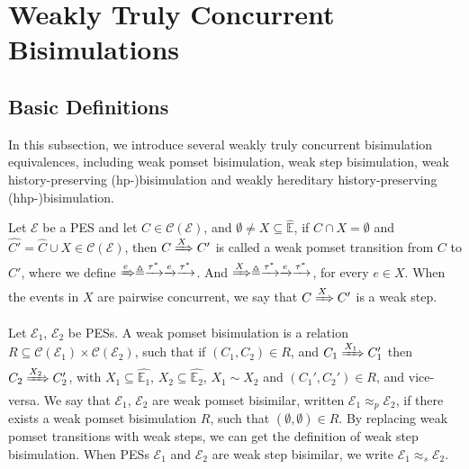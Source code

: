 \section{Weakly Truly Concurrent Bisimulations}\label{wtcb}

\subsection{Basic Definitions}\label{WTCC}

In this subsection, we introduce several weakly truly concurrent bisimulation equivalences, including weak pomset bisimulation, weak step bisimulation, weak history-preserving (hp-)bisimulation and weakly hereditary history-preserving (hhp-)bisimulation.

\begin{definition}\label{WPT}
Let $\mathcal{E}$ be a PES and let $C\in\mathcal{C}(\mathcal{E})$, and $\emptyset\neq X\subseteq \hat{\mathbb{E}}$, if $C\cap X=\emptyset$ and $\hat{C'}=\hat{C}\cup X\in\mathcal{C}(\mathcal{E})$, then $C\xRightarrow{X} C'$ is called a weak pomset transition from $C$ to $C'$, where we define $\xRightarrow{e}\triangleq\xrightarrow{\tau^*}\xrightarrow{e}\xrightarrow{\tau^*}$. And $\xRightarrow{X}\triangleq\xrightarrow{\tau^*}\xrightarrow{e}\xrightarrow{\tau^*}$, for every $e\in X$. When the events in $X$ are pairwise concurrent, we say that $C\xRightarrow{X}C'$ is a weak step.
\end{definition}

\begin{definition}\label{WPSB}
Let $\mathcal{E}_1$, $\mathcal{E}_2$ be PESs. A weak pomset bisimulation is a relation $R\subseteq\mathcal{C}(\mathcal{E}_1)\times\mathcal{C}(\mathcal{E}_2)$, such that if $(C_1,C_2)\in R$, and $C_1\xRightarrow{X_1}C_1'$ then $C_2\xRightarrow{X_2}C_2'$, with $X_1\subseteq \hat{\mathbb{E}_1}$, $X_2\subseteq \hat{\mathbb{E}_2}$, $X_1\sim X_2$ and $(C_1',C_2')\in R$, and vice-versa. We say that $\mathcal{E}_1$, $\mathcal{E}_2$ are weak pomset bisimilar, written $\mathcal{E}_1\approx_p\mathcal{E}_2$, if there exists a weak pomset bisimulation $R$, such that $(\emptyset,\emptyset)\in R$. By replacing weak pomset transitions with weak steps, we can get the definition of weak step bisimulation. When PESs $\mathcal{E}_1$ and $\mathcal{E}_2$ are weak step bisimilar, we write $\mathcal{E}_1\approx_s\mathcal{E}_2$.
\end{definition}

